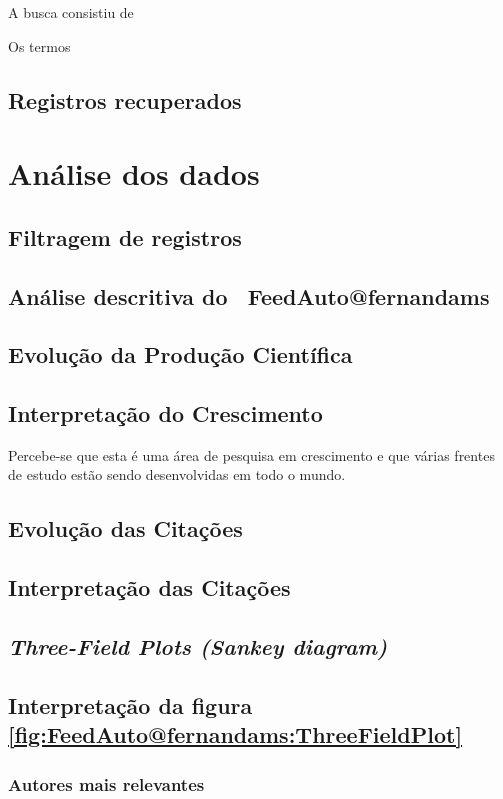 A busca consistiu de 

Os termos

\subsection{Registros recuperados}

\section{Análise dos dados}

\subsection{Filtragem de registros}

\subsection{Análise descritiva do \dataset\ FeedAuto@fernandams}

\subsection{Evolução da Produção Científica}

\subsection{Interpretação do Crescimento}

Percebe-se que esta é uma área de pesquisa em crescimento e que várias frentes de estudo estão sendo desenvolvidas em todo o mundo.

\subsection{Evolução das Citações}

\subsection{Interpretação das Citações}

\subsection{\textit{Three-Field Plots (Sankey diagram)} \label{FeedAuto:Sankey}}

\subsection{Interpretação da figura \ref{fig:FeedAuto@fernandams:ThreeFieldPlot}}

\subsubsection{Autores mais relevantes\label{FeedAuto:Sankey:AutoresRelevantes}}
